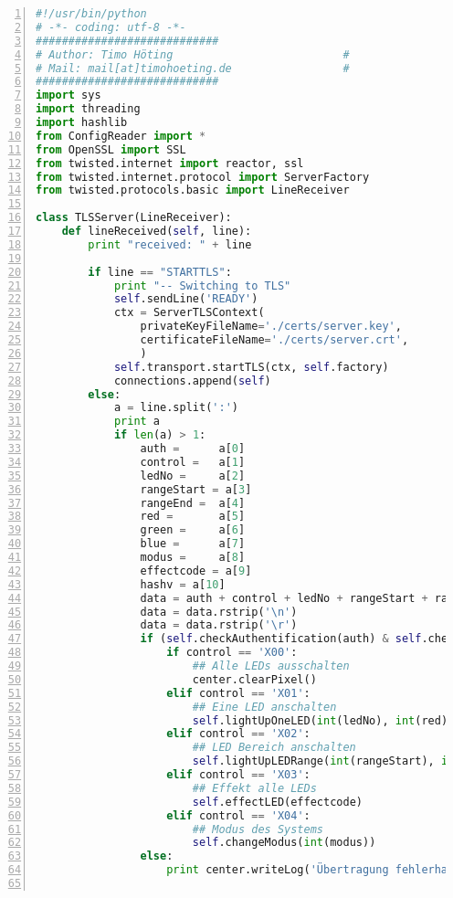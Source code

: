 \begin{lstlisting}[caption =Implementierung des SSL Servers, language=python, frame=single, breaklines=true,columns=fullflexible, commentstyle=\color{gray}\upshape, captionpos=b, numbers = left]
#!/usr/bin/python
# -*- coding: utf-8 -*-
############################
# Author: Timo Höting       		           #
# Mail: mail[at]timohoeting.de  		       #
############################
import sys
import threading
import hashlib
from ConfigReader import *
from OpenSSL import SSL
from twisted.internet import reactor, ssl
from twisted.internet.protocol import ServerFactory
from twisted.protocols.basic import LineReceiver

class TLSServer(LineReceiver):
    def lineReceived(self, line):
        print "received: " + line

        if line == "STARTTLS":
            print "-- Switching to TLS"
            self.sendLine('READY')
            ctx = ServerTLSContext(
                privateKeyFileName='./certs/server.key',
                certificateFileName='./certs/server.crt',
                )
            self.transport.startTLS(ctx, self.factory)
            connections.append(self)
        else:
            a = line.split(':')
            print a
            if len(a) > 1:
                auth = 		a[0]
                control = 	a[1]
                ledNo = 	a[2]
                rangeStart = a[3]
                rangeEnd = 	a[4]
                red = 		a[5]
                green = 	a[6]
                blue = 		a[7]
                modus = 	a[8]
                effectcode = a[9]
                hashv = a[10]
                data = auth + control + ledNo + rangeStart + rangeEnd + red + green + blue + modus + effectcode
                data = data.rstrip('\n')
                data = data.rstrip('\r')
                if (self.checkAuthentification(auth) & self.checkTransmissionData(data, hashv)):
                    if control == 'X00':
                        ## Alle LEDs ausschalten
                        center.clearPixel()
                    elif control == 'X01':
                        ## Eine LED anschalten
                        self.lightUpOneLED(int(ledNo), int(red), int(green), int(blue))
                    elif control == 'X02':
                        ## LED Bereich anschalten
                        self.lightUpLEDRange(int(rangeStart), int(rangeEnd), int(red), int(green), int(blue))
                    elif control == 'X03':
                        ## Effekt alle LEDs
                        self.effectLED(effectcode)
                    elif control == 'X04':
                        ## Modus des Systems
                        self.changeModus(int(modus))
                else:
                    print center.writeLog('Übertragung fehlerhaft')


\end{lstlisting}
